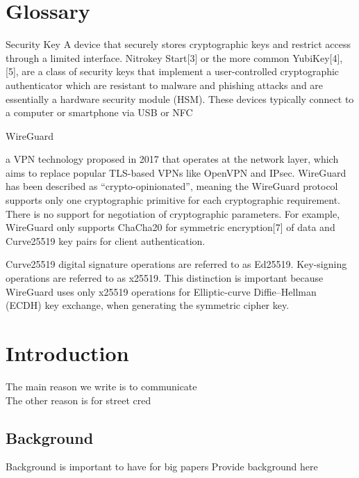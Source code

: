 \documentclass [11pt, proquest] {uwthesis}[2020/02/24]
\begin{document}
\chapter*{Glossary}      %
\thispagestyle{plain}

\begin{glossary}

\item[Security Key]
A device that securely stores cryptographic keys and restrict access through a limited interface. 
Nitrokey Start[3] or the more common YubiKey[4], [5], are a class of security keys that implement a user-controlled 
cryptographic authenticator which are resistant to malware and phishing attacks and are essentially a hardware security module (HSM). 
These devices typically connect to a computer or smartphone via USB or NFC

\item[WireGuard]

a VPN technology proposed in 2017 that operates at the network layer, which aims to replace popular TLS-based VPNs like OpenVPN and IPsec.
WireGuard has been described as “crypto-opinionated”, meaning the WireGuard protocol supports only one cryptographic primitive for each cryptographic requirement.
There is no support for negotiation of cryptographic parameters. For example, WireGuard only supports ChaCha20 for symmetric 
encryption[7] of data and Curve25519 key pairs for client authentication.

\item[Curve25519]
digital signature operations are referred to as Ed25519. Key-signing operations are referred to as x25519. 
This distinction is important because WireGuard uses only x25519 operations for Elliptic-curve Diffie–Hellman (ECDH) key exchange, 
when generating the symmetric cipher key.


\end{glossary}

\textpages

\chapter {Introduction}
The main reason we write is to communicate\\

The other reason is for street cred

\section {Background}
Background is important to have for big papers
Provide background here
\end{document}
